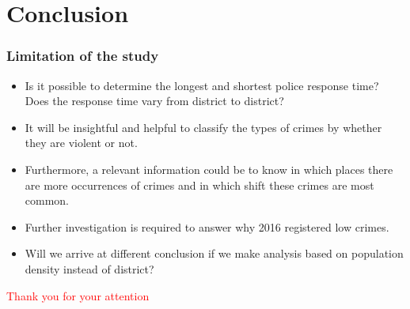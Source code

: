 \documentclass[usenames,dvipsnames]{beamer}
\begin{document}
\section{Conclusion}
\begin{frame}
\frametitle{Limitation of the study}

\begin{itemize}
\item Is it possible to determine the longest and shortest police response time? Does the response time vary from district to district?
\item It will be insightful and helpful to classify the types of crimes by whether they are violent or not.
\item Furthermore, a relevant information could be to know in which places there are more occurrences of crimes and in which shift these crimes are most common.
\item Further investigation is required to answer why 2016 registered low crimes.
\item Will we arrive at different conclusion if we make analysis based on  population density instead of district?
\end{itemize}
\end{frame}
\begin{frame}
\Huge{\centerline{\textcolor{red}{Thank you for your attention}}}
\end{frame}




\end{document}
